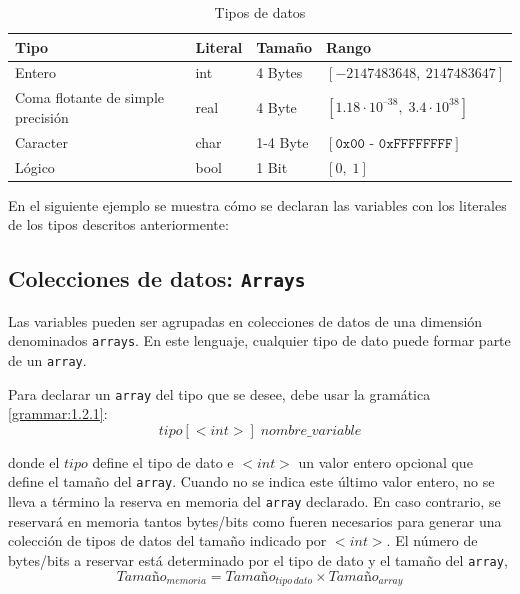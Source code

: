 \documentclass[11pt, english]{article}
\begin{document}
\begin{table}[h!]
	\begin{center}
		\caption{Tipos de datos}
		\label{tab:table1}
		\begin{tabular}{l|l|l|l}
			\toprule
			\textbf{Tipo} & \textbf{Literal} & \textbf{Tamaño} & \textbf{Rango}\\
			\midrule
			Entero & int &4 Bytes & $\left [-2147483648,\: 2147483647 \right]$\\
			Coma flotante de simple precisión & real & 4 Byte & $\left [ 1.18 \cdot 10^{–38},\; 3.4 \cdot 10^{38} \right ]$\\
			Caracter & char & 1-4 Byte & $\left [ \texttt{0x00 - 0xFFFFFFFF} \right ]$\\
			Lógico & bool & 1 Bit & $\left [0,\; 1 \right ]$\\
			\bottomrule
		\end{tabular}
	\end{center}
\end{table}

En el siguiente ejemplo se muestra cómo se declaran las variables con los literales de los tipos descritos anteriormente:



\subsection{Colecciones de datos: \texttt{Arrays}}\label{arrays}
Las variables pueden ser agrupadas en colecciones de datos de una dimensión denominados \texttt{arrays}. En este lenguaje, cualquier tipo de dato puede formar parte de un \texttt{array}.

Para declarar un \texttt{array} del tipo que se desee, debe usar la gramática \ref{grammar:1.2.1}:
	\begin{equation}\label{grammar:1.2.1}
		tipo[<int>]\; nombre\_variable
	\end{equation}

donde el $tipo$ define el tipo de dato e $<int>$ un valor entero opcional que define el tamaño del \texttt{array}. Cuando no se indica este último valor entero, no se lleva a término la reserva en memoria del \texttt{array} declarado. En caso contrario, se reservará en memoria tantos bytes/bits como fueren necesarios para generar una colección de tipos de datos del tamaño indicado por $<int>$. El número de bytes/bits a reservar está determinado por el tipo de dato y el tamaño del \texttt{array},
	\begin{equation}\label{eq:1.2}
		Tamaño_{memoria} = Tamaño_{tipo\, dato} \times Tamaño_{array}
	\end{equation}
\end{document}
